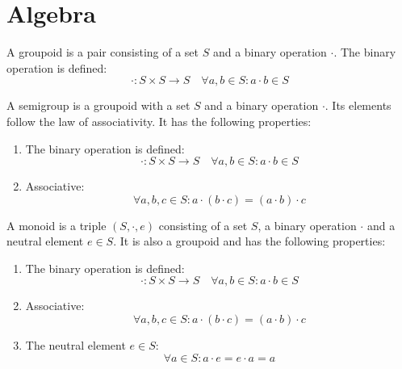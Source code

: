 \chapter{Algebra}

\begin{definition}[Groupoid]
    A groupoid is a pair consisting of a set $S$ and a binary operation $\cdot$.
    The binary operation is defined:
    \begin{equation}
        \cdot: S \times S \rightarrow S \quad \forall a,b \in S: a \cdot b \in S
    \end{equation}
\end{definition}

\begin{definition}[Semigroup]
    A semigroup is a groupoid with a set $S$ and a binary operation $\cdot$.
    Its elements follow the law of associativity.
    It has the following properties:
    \begin{enumerate}
        \item The binary operation is defined:
            \begin{equation}
                \cdot: S \times S \rightarrow S \quad \forall a,b \in S: a \cdot b \in S
            \end{equation}
        \item Associative:
            \begin{equation}
                \forall a,b,c \in S: a \cdot (b \cdot c) = (a \cdot b) \cdot c
            \end{equation} 
    \end{enumerate}
\end{definition}

\begin{definition}[Monoid]
    A monoid is a triple $(S, \cdot, e)$ consisting of a set $S$, a binary operation $\cdot$ and 
    a neutral element $e \in S$.
    It is also a groupoid and has the following properties:
    \begin{enumerate}
        \item The binary operation is defined:
            \begin{equation}
                \cdot: S \times S \rightarrow S \quad \forall a,b \in S: a \cdot b \in S
            \end{equation}
        \item Associative:
            \begin{equation}
                \forall a,b,c \in S: a \cdot (b \cdot c) = (a \cdot b) \cdot c
            \end{equation} 
        \item The neutral element $e \in S$:
            \begin{equation}
                \forall a \in S: a \cdot e = e \cdot a = a
            \end{equation}
    \end{enumerate}
\end{definition}

